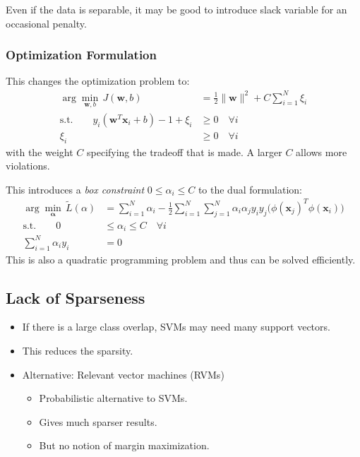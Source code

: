\documentclass[a4paper, 11pt, accentcolor = tud3b]{tudreport}
\renewcommand{\vec}[1]{\mathbf{#1}}
\begin{document}
				Even if the data is separable, it may be good to introduce slack variable for an occasional penalty.

				\subsubsection{Optimization Formulation}
					This changes the optimization problem to:
					\begin{align}
						\arg\min_{ \vec{w}, b } \, J(\vec{w}, b) &= \frac{1}{2} \lVert \vec{w} \rVert^2 + C\sum_{i = 1}^{N} \xi_i \\
						\textrm{s.t.} \qquad
						y_i(\vec{w}^T \vec{x}_i + b) - 1 + \xi_i &\geq 0 \quad\forall i \\
						\xi_i &\geq 0 \quad\forall i
					\end{align}
					with the weight \(C\) specifying the tradeoff that is made. A larger \(C\) allows more violations.
					
					This introduces a \emph{box constraint} \( 0 \leq \alpha_i \leq C \) to the dual formulation:
					\begin{align}
						\arg\min_{ \vec{\alpha} } \, \tilde{L}(\alpha) &= \sum_{i = 1}^{N} \alpha_i - \frac{1}{2} \sum_{i = 1}^{N} \sum_{j = 1}^{N} \alpha_i \alpha_j y_i y_j \big(\phi(\vec{x}_j)^T \phi(\vec{x}_i)\big) \\
						\textrm{s.t.} \qquad
						0 &\leq \alpha_i \leq C \quad\forall i \\
						\sum_{i = 1}^{N} \alpha_i y_i &= 0
					\end{align}
					This is also a quadratic programming problem and thus can be solved efficiently.
			
			\subsection{Lack of Sparseness}
				\begin{itemize}
					\item If there is a large class overlap, SVMs may need many support vectors.
					\item This reduces the sparsity.
					\item Alternative: Relevant vector machines (RVMs)
						\begin{itemize}
							\item Probabilistic alternative to SVMs.
							\item Gives much sparser results.
							\item But no notion of margin maximization.
						\end{itemize}
				\end{itemize}
\end{document}

